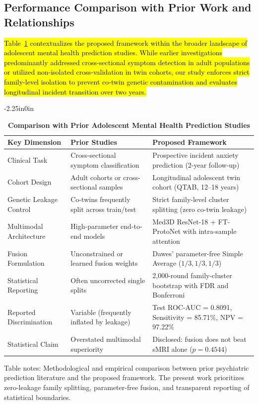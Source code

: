 \documentclass[10pt,letterpaper]{article}
\begin{document}
\subsection*{Performance Comparison with Prior Work and Relationships}

\hl{Table~\ref{tab:prior_comparison} contextualizes the proposed framework within the broader landscape of adolescent mental health prediction studies. While earlier investigations predominantly addressed cross-sectional symptom detection in adult populations or utilized non-isolated cross-validation in twin cohorts, our study enforces strict family-level isolation to prevent co-twin genetic contamination and evaluates longitudinal incident transition over two years.}

\begin{table}[!t]
\begin{adjustwidth}{-2.25in}{0in}
\centering
\caption{\textbf{Comparison with Prior Adolescent Mental Health Prediction Studies}}
\label{tab:prior_comparison}
\footnotesize
\renewcommand{\arraystretch}{1.15}
\begin{tabular}{|p{4.5cm}|p{5.5cm}|p{6.0cm}|}
\hline
\textbf{Key Dimension} & \textbf{Prior Studies} & \textbf{Proposed Framework} \\
\hline
Clinical Task & Cross-sectional symptom classification & Prospective incident anxiety prediction (2-year follow-up) \\
\hline
Cohort Design & Adult cohorts or cross-sectional samples & Longitudinal adolescent twin cohort (QTAB, 12--18 years) \\
\hline
Genetic Leakage Control & Co-twins frequently split across train/test & Strict family-level cluster splitting (zero co-twin leakage) \\
\hline
Multimodal Architecture & High-parameter end-to-end models & Med3D ResNet-18 + FT-ProtoNet with intra-sample attention \\
\hline
Fusion Formulation & Unconstrained or learned fusion weights & Dawes' parameter-free Simple Average ($1/3, 1/3, 1/3$) \\
\hline
Statistical Reporting & Often uncorrected single splits & 2,000-round family-cluster bootstrap with FDR and Bonferroni \\
\hline
Reported Discrimination & Variable (frequently inflated by leakage) & Test ROC-AUC = 0.8091, Sensitivity = 85.71\%, NPV = 97.22\% \\
\hline
Statistical Claim & Overstated multimodal superiority & Disclosed: fusion does not beat sMRI alone ($p = 0.4544$) \\
\hline
\end{tabular}
\begin{flushleft}
Table notes: Methodological and empirical comparison between prior psychiatric prediction literature and the proposed framework. The present work prioritizes zero-leakage family splitting, parameter-free fusion, and transparent reporting of statistical boundaries.
\end{flushleft}
\end{adjustwidth}
\end{table}
\end{document}
